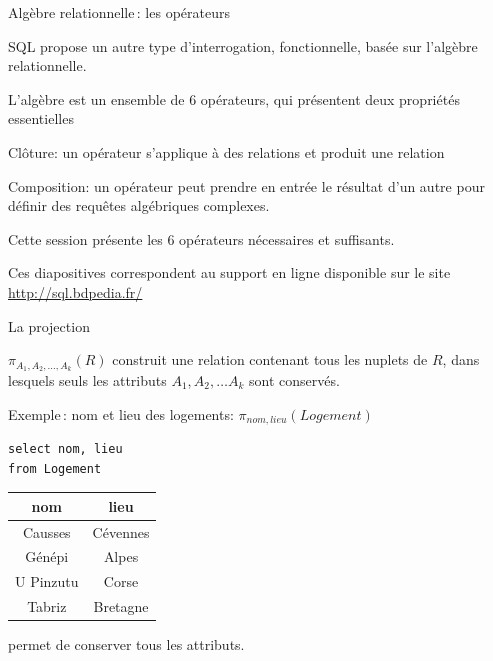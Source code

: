 
\begin{frame}[fragile]{Algèbre relationnelle\,: les opérateurs}

SQL propose un autre type d'interrogation, \alert{fonctionnelle},
basée sur \alert{l'algèbre relationnelle}. 

\vfill

L'algèbre est un ensemble de 6 opérateurs, qui présentent deux propriétés essentielles

\begin{redbullet}
  \item \alert{Clôture}: un opérateur s'applique à des relations et produit une relation
  \item \alert{Composition}: un opérateur peut prendre en entrée le résultat d'un autre pour
      définir des \alert{requêtes} algébriques complexes.
\end{redbullet}

\vfill

Cette session présente les 6 opérateurs nécessaires et suffisants.

\vfill
\begin{blocgauche}
\alert{Ces diapositives correspondent au support en ligne disponible sur
le site \url{http://sql.bdpedia.fr/}}
\end{blocgauche}

\end{frame}


\begin{frame}[fragile]{La projection }

$\pi_{A_1, A_2, \ldots,A_k}(R)$ construit une relation contenant 
tous les nuplets de $R$,  dans lesquels seuls les attributs $A_1, A_2, \ldots A_k$ 
sont conservés. 

\vfill

Exemple\,: nom et lieu des logements: $\pi_{nom, lieu}(Logement) $

\vfill

\begin{verbatim}
select nom, lieu
from Logement
\end{verbatim}
\vfill
\begin{tabular}{c|c}
\textbf{nom} & \textbf{lieu}\\ \hline 
Causses & Cévennes\\ \hline 
Génépi & Alpes\\ \hline 
U Pinzutu & Corse\\ \hline 
Tabriz & Bretagne\\ \hline 
\end{tabular}

\vfill

\begin{blocgauche}
 permet de conserver tous les attributs.
\end{blocgauche}
\end{frame}

